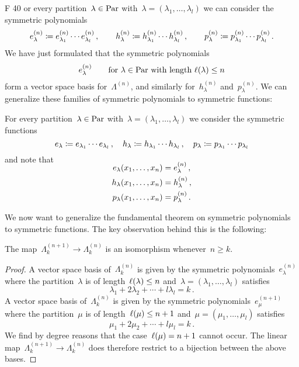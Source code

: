 \documentclass[a4paper, 11pt, twoside=semi]{scrartcl}
\begin{document}
F 40 
or every partition~$\lambda \in \mathrm{Par}$ with~$\lambda = (\lambda_1, \dotsc, \lambda_l)$ we can consider the symmetric polynomials
\[
  e^{(n)}_\lambda
  \coloneqq
  e^{(n)}_{\lambda_1} \dotsm e^{(n)}_{\lambda_l} \,,
  \qquad
  h^{(n)}_\lambda
  \coloneqq
  h^{(n)}_{\lambda_1} \dotsm h^{(n)}_{\lambda_l} \,,
  \qquad
  p^{(n)}_\lambda
  \coloneqq
  p^{(n)}_{\lambda_1} \dotsm p^{(n)}_{\lambda_l} \,.
\]
We have just formulated that the symmetric polynomials
\[
  e^{(n)}_\lambda
  \qquad
  \text{for $\lambda \in \mathrm{Par}$ with length~$\ell(\lambda) \leq n$}
\]
form a vector space basis for~$\Lambda^{(n)}$, and similarly for~$h^{(n)}_\lambda$ and~$p^{(n)}_\lambda$.
We can generalize these families of symmetric polynomials to symmetric functions:

\begin{example}
  For every partition~$\lambda \in \mathrm{Par}$ with~$\lambda = (\lambda_1, \dotsc, \lambda_l)$ we consider the symmetric functions
  \[
    e_\lambda
    \coloneqq
    e_{\lambda_1} \dotsm e_{\lambda_l} \,,
    \quad
    h_\lambda
    \coloneqq
    h_{\lambda_1} \dotsm h_{\lambda_l} \,,
    \quad
    p_\lambda
    \coloneqq
    p_{\lambda_1} \dotsm p_{\lambda_l}
  \]
  and note that
  \begin{align*}
    \SwapAboveDisplaySkip
    e_\lambda(x_1, \dotsc, x_n)
    &=
    e^{(n)}_\lambda \,,
    \\
    h_\lambda(x_1, \dotsc, x_n)
    &=
    h^{(n)}_\lambda \,,
    \\
    p_\lambda(x_1, \dotsc, x_n)
    &=
    p^{(n)}_\lambda \,.
  \end{align*}
\end{example}

We now want to generalize the fundamental theorem on symmetric polynomials to symmetric functions.
The key observation behind this is the following:

\begin{proposition}
  \label{sequence stabilizes}
  The map~$\Lambda^{(n+1)}_k \to \Lambda^{(n)}_k$ is an isomorphism whenever~$n \geq k$. 
\end{proposition}

\begin{proof}
  A vector space basis of~$\Lambda^{(n)}_k$ is given by the symmetric polynomials~$e^{(n)}_\lambda$ where the partition~$\lambda$ is of length~$\ell(\lambda) \leq n$ and~$\lambda = (\lambda_1, \dotsc, \lambda_l)$ satisfies
  \[
    \lambda_1 + 2 \lambda_2 + \dotsb + l \lambda_l = k \,.
  \]
  A vector space basis of~$\Lambda^{(n)}_k$ is given by the symmetric polynomials~$e^{(n+1)}_\mu$ where the partition~$\mu$ is of length~$\ell(\mu) \leq n+1$ and~$\mu = (\mu_1, \dotsc, \mu_l)$ satisfies
  \[
    \mu_1 + 2 \mu_2 + \dotsb + l \mu_l = k \,.
  \]
  We find by degree reasons that the case~$\ell(\mu) = n+1$ cannot occur.
  The linear map~$\Lambda^{(n+1)}_k \to \Lambda^{(n)}_k$ does therefore restrict to a bijection between the above bases.
\end{proof}
\end{document}
